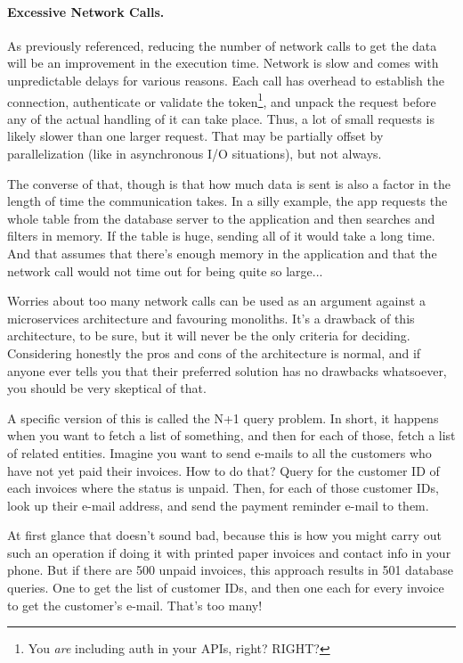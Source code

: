 \paragraph{Excessive Network Calls.}
As previously referenced, reducing the number of network calls to get the data will be an improvement in the execution time. Network is slow and comes with unpredictable delays for various reasons. Each call has overhead to establish the connection, authenticate or validate the token\footnote{You \textit{are} including auth in your APIs, right? RIGHT?}, and unpack the request before any of the actual handling of it can take place. Thus, a lot of small requests is likely slower than one larger request. That may be partially offset by parallelization (like in asynchronous I/O situations), but not always.

The converse of that, though is that how much data is sent is also a factor in the length of time the communication takes. In a silly example, the app requests the whole table from the database server to the application and then searches and filters in memory. If the table is huge, sending all of it would take a long time. And that assumes that there's enough memory in the application and that the network call would not time out for being quite so large...

Worries about too many network calls can be used as an argument against a microservices architecture and favouring monoliths. It's a drawback of this architecture, to be sure, but it will never be the only criteria for deciding. Considering honestly the pros and cons of the architecture is normal, and if anyone ever tells you that their preferred solution has no drawbacks whatsoever, you should be very skeptical of that.

A specific version of this is called the N+1 query problem. In short, it happens when you want to fetch a list of something, and then for each of those, fetch a list of related entities. Imagine you want to send e-mails to all the customers who have not yet paid their invoices. How to do that? Query for the customer ID of each invoices where the status is unpaid. Then, for each of those customer IDs, look up their e-mail address, and send the payment reminder e-mail to them.

At first glance that doesn't sound bad, because this is how you might carry out such an operation if doing it with printed paper invoices and contact info in your phone. But if there are 500 unpaid invoices, this approach results in 501 database queries. One to get the list of customer IDs, and then one each for every invoice to get the customer's e-mail. That's too many! 

